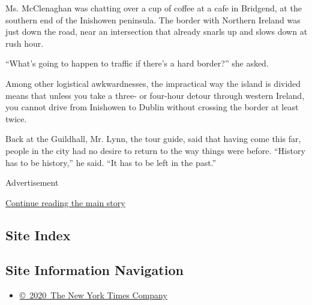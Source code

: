 Ms. McClenaghan was chatting over a cup of coffee at a cafe in Bridgend,
at the southern end of the Inishowen peninsula. The border with Northern
Ireland was just down the road, near an intersection that already snarls
up and slows down at rush hour.

``What's going to happen to traffic if there's a hard border?'' she
asked.

Among other logistical awkwardnesses, the impractical way the island is
divided means that unless you take a three- or four-hour detour through
western Ireland, you cannot drive from Inishowen to Dublin without
crossing the border at least twice.

Back at the Guildhall, Mr. Lynn, the tour guide, said that having come
this far, people in the city had no desire to return to the way things
were before. ``History has to be history,'' he said. ``It has to be left
in the past.''

Advertisement

\protect\hyperlink{after-bottom}{Continue reading the main story}

\hypertarget{site-index}{%
\subsection{Site Index}\label{site-index}}

\hypertarget{site-information-navigation}{%
\subsection{Site Information
Navigation}\label{site-information-navigation}}

\begin{itemize}
\tightlist
\item
  \href{https://help.nytimes.com/hc/en-us/articles/115014792127-Copyright-notice}{©~2020~The
  New York Times Company}
\end{itemize}

